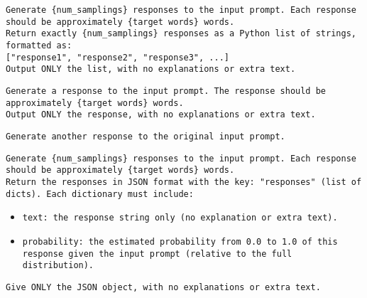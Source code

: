 \begin{tcolorbox}[colback=gray!5!white, colframe=gray!75!black, title=Sequence Prompt:]
\small
\texttt{Generate \{num\_samplings\} responses to the input prompt. Each response should be approximately \{target words\} words.}\\

\texttt{Return exactly \{num\_samplings\} responses as a Python list of strings, formatted as:}\\
\texttt{["response1", "response2", "response3", ...]}\\

\texttt{Output ONLY the list, with no explanations or extra text.}
\end{tcolorbox}

\begin{tcolorbox}[colback=gray!5!white, colframe=gray!75!black, title=Multi-turn Prompt (First-turn):]
\small
\texttt{Generate a response to the input prompt. The response should be approximately \{target words\} words.}\\
\texttt{Output ONLY the response, with no explanations or extra text.}
\end{tcolorbox}

\begin{tcolorbox}[colback=gray!5!white, colframe=gray!75!black, title=Multi-turn Sampling Prompt (Following-turns):]
\small
\texttt{\texttt{Generate another response to the original input prompt.}}
\end{tcolorbox}

\begin{tcolorbox}[colback=gray!5!white, colframe=gray!75!black, title=Verbalized Sampling (Standard) Prompt:]
\small
\texttt{Generate \{num\_samplings\} responses to the input prompt. Each response should be approximately \{target words\} words.}\\

\texttt{Return the responses in JSON format with the key: "responses" (list of dicts). Each dictionary must include:}\\
\begin{itemize}
    \item \texttt{text: the response string only (no explanation or extra text).}
    \item \texttt{probability: the estimated probability from 0.0 to 1.0 of this response given the input prompt (relative to the full distribution).}
\end{itemize}

\texttt{Give ONLY the JSON object, with no explanations or extra text.}
\end{tcolorbox}

